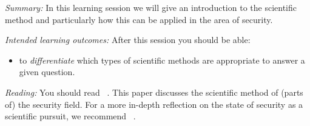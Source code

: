 \mode*


\emph{Summary:}
In this learning session we will give an introduction to the scientific method 
and particularly how this can be applied in the area of security.

\emph{Intended learning outcomes:}
After this session you should be able:
\begin{itemize}
  \item to \emph{differentiate} which types of scientific methods are 
    appropriate to answer a given question.
\end{itemize}


\emph{Reading:}
You should read 
~\cite{HowToDesignSecurityExperiments}.
This paper discusses the scientific method of (parts of) the security field.
For a more in-depth reflection on the state of security as a scientific pursuit, 
we recommend
~\cite{SecurityAsAScience}.
